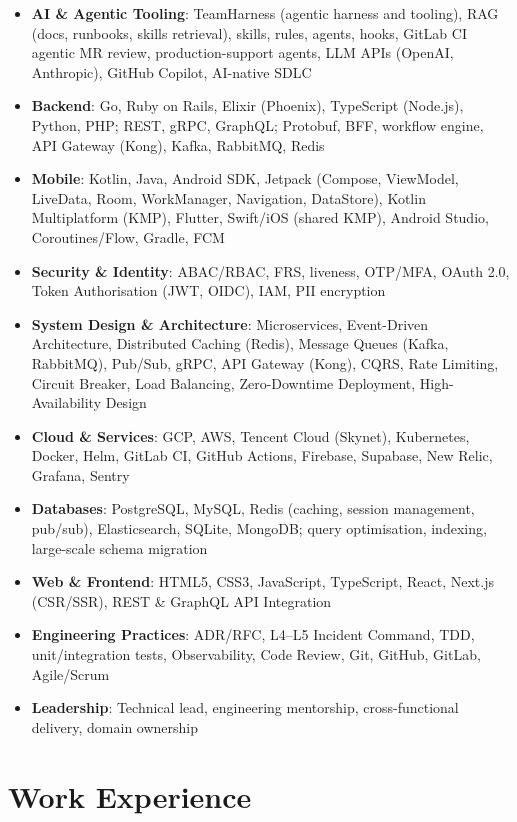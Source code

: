 \documentclass[10pt]{article}
\begin{document}
{\begin{itemize}
\item \textbf{AI \& Agentic Tooling}: TeamHarness (agentic harness and tooling), RAG (docs, runbooks, skills retrieval), skills, rules, agents, hooks, GitLab CI agentic MR review, production-support agents, LLM APIs (OpenAI, Anthropic), GitHub Copilot, AI-native SDLC
\item \textbf{Backend}: Go, Ruby on Rails, Elixir (Phoenix), TypeScript (Node.js), Python, PHP; REST, gRPC, GraphQL; Protobuf, BFF, workflow engine, API Gateway (Kong), Kafka, RabbitMQ, Redis
\item \textbf{Mobile}: Kotlin, Java, Android SDK, Jetpack (Compose, ViewModel, LiveData, Room, WorkManager, Navigation, DataStore), Kotlin Multiplatform (KMP), Flutter, Swift/iOS (shared KMP), Android Studio, Coroutines/Flow, Gradle, FCM
\item \textbf{Security \& Identity}: ABAC/RBAC, FRS, liveness, OTP/MFA, OAuth 2.0, Token Authorisation (JWT, OIDC), IAM, PII encryption
\item \textbf{System Design \& Architecture}: Microservices, Event-Driven Architecture, Distributed Caching (Redis), Message Queues (Kafka, RabbitMQ), Pub/Sub, gRPC, API Gateway (Kong), CQRS, Rate Limiting, Circuit Breaker, Load Balancing, Zero-Downtime Deployment, High-Availability Design
\item \textbf{Cloud \& Services}: GCP, AWS, Tencent Cloud (Skynet), Kubernetes, Docker, Helm, GitLab CI, GitHub Actions, Firebase, Supabase, New Relic, Grafana, Sentry
\item \textbf{Databases}: PostgreSQL, MySQL, Redis (caching, session management, pub/sub), Elasticsearch, SQLite, MongoDB; query optimisation, indexing, large-scale schema migration
\item \textbf{Web \& Frontend}: HTML5, CSS3, JavaScript, TypeScript, React, Next.js (CSR/SSR), REST \& GraphQL API Integration
\item \textbf{Engineering Practices}: ADR/RFC, L4--L5 Incident Command, TDD, unit/integration tests, Observability, Code Review, Git, GitHub, GitLab, Agile/Scrum
\item \textbf{Leadership}: Technical lead, engineering mentorship, cross-functional delivery, domain ownership
\end{itemize}

\section*{Work Experience}

}
\end{document}
